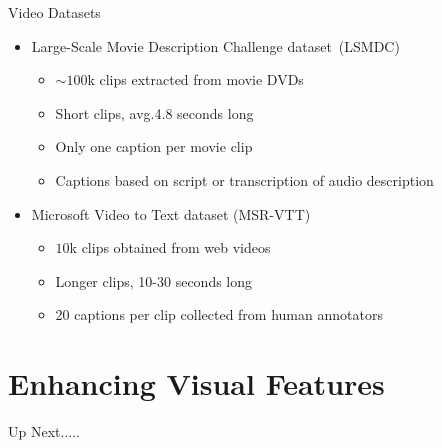 \documentclass{beamer}
\begin{document}
\begin{frame}{Video Datasets}
\begin{itemize}
    \item Large-Scale Movie Description Challenge dataset~(LSMDC)
       \begin{itemize}
           \item $\sim100$k clips extracted from movie DVDs
           \item Short clips, avg.\@ 4.8 seconds long
           \item Only one caption per movie clip 
           \item Captions based on script or transcription of audio description \\[10mm]
   \end{itemize}
    \item Microsoft Video to Text dataset (MSR-VTT) 
       \begin{itemize}
           \item $10$k clips obtained from web videos 
           \item Longer clips, 10-30 seconds long
           \item 20 captions per clip collected from human annotators
       \end{itemize}
\end{itemize}
\end{frame}
\section{Enhancing Visual Features}
\begin{frame}{Up Next.....}
\tableofcontents[currentsection] 
\end{frame}
\end{document}
